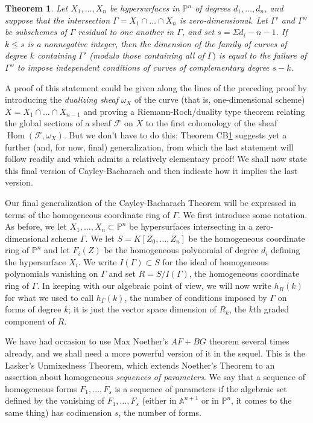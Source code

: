 \documentclass{bull-l}
\newcommand{\Hom}{\operatorname{Hom}}
\theoremstyle{pplain}
\newtheorem{thmcb}{Theorem}
\theoremstyle{definition}
\begin{document}
\begin{thmcb} \label{thmcb7}
Let $X_1,\dots,X_n$ be hypersurfaces in $\mathbb{P}^n$ of degrees
$d_1,\dots,d_n$, and suppose that the intersection $\Gamma=X_1\cap \dots\cap
X_n$ is zero-dimensional. Let $\Gamma'$ and $\Gamma''$ be subschemes of
$\Gamma$ residual to one another in $\Gamma$, and set $s=\Sigma d_i-n-1$. If
$k\le s$ is a nonnegative integer, then the dimension of the family of curves
of degree $k$ containing $\Gamma'$ \textup{(}modulo 
those containing all of $\Gamma)$ is
equal to the failure of $\Gamma''$ to impose independent conditions of curves
of complementary degree $s-k$.
\end{thmcb}

A proof of this statement could be given along the lines of the preceding proof
by introducing the \emph{dualizing sheaf} $\omega_X$ of the curve (that is, 
one-dimensional scheme) $X=X_1\cap \dots\cap X_{n-1}$ and proving a
Riemann-Roch/duality type theorem relating the global sections of a sheaf $
\mathcal{F}$ on $X$ to the first cohomology of the sheaf $\Hom(\mathcal{F},
\omega_X)$.  But we don't have to do this: Theorem CB\ref{thmcb7} suggests yet
a further (and, for now, final) generalization, from which the last statement
will follow readily and which admits a relatively elementary proof!  We shall
now state this final version of Cayley-Bacharach and then indicate 
how it implies the last version.

Our final generalization of the Cayley-Bacharach Theorem will be expressed in
terms of the homogeneous coordinate ring of $\Gamma$.  We first introduce some
notation.  As before, we let $X_1,\dots,X_n\subset \mathbb{P}^n$ be
hypersurfaces intersecting in a zero-dimensional scheme $\Gamma$.  We let
$S=K[Z_0,\dots,Z_n]$ be the homogeneous coordinate ring of $\mathbb{P}^n$ and
let $F_i(Z)$ be the homogeneous polynomial of degree $d_i$ defining the
hypersurface $X_i$. We write $I(\Gamma)\subset S$ for the ideal of homogeneous 
polynomials vanishing on  $\Gamma$ and set $R=S/I(\Gamma)$, the homogeneous
coordinate ring of $\Gamma$.  In keeping with our algebraic point of view, we
will now write $h_R(k)$ for what we used to call $h_\Gamma(k)$, the number of 
conditions imposed by $\Gamma$ on forms of degree $k$; it is just the vector
space dimension of $R_k$, the $k$th graded component of $R$.

We have had occasion to use Max Noether's $AF+BG$ theorem several times
already, and we shall need a more powerful version of it in the sequel.  This
is the Lasker's Unmixedness Theorem, which extends Noether's Theorem to an
assertion about homogeneous \emph{sequences of parameters}.  We say that a 
sequence of homogeneous forms $F_1,\dots,F_s$ is a sequence of parameters if
the algebraic set defined by the vanishing of $F_1,\dots,F_s$ (either in
$\mathbb{A}^{n+1}$ or in $\mathbb{P}^n$, it comes to the same thing) has 
codimension $s$, the number of forms.
\end{document}
